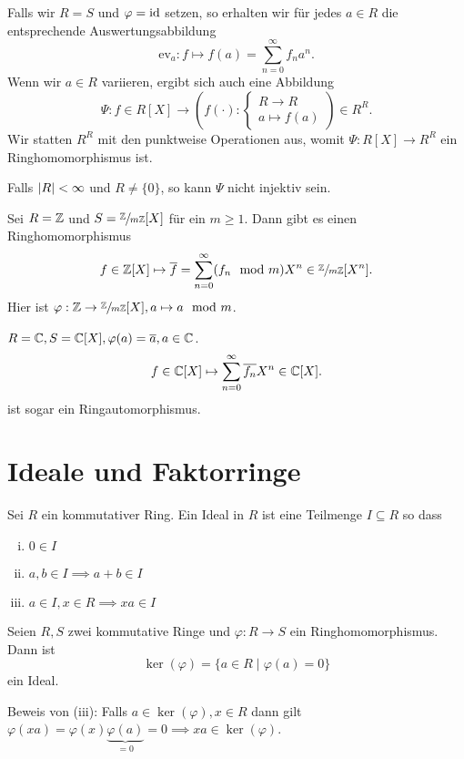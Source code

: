 \begin{eg}
	Falls wir $R = S$ und $\varphi = \operatorname{id}$ setzen, so erhalten wir für jedes $a \in R$ die entsprechende Auswertungsabbildung
	\[
		\text{ev}_{a} : f \mapsto f(a) = \sum_{n=0}^{\infty} f_{n} a^{n}
	.\] 
	Wenn wir $a \in R$ variieren, ergibt sich auch eine Abbildung
	\[
		\Psi: f \in R[X] \to \left(f(\cdot): \begin{cases}
			R \to R\\
			a \mapsto f(a)
		\end{cases}\right) \in R^{R}
	.\]
	Wir statten $R^{R}$ mit den punktweise Operationen aus, womit $\Psi: R[X] \to R^{R}$ ein Ringhomomorphismus ist.
	
	Falls $\abs{R} < \infty$ und $R \neq \{0\}$, so kann $\Psi$ nicht injektiv sein. 
\end{eg}

\begin{eg}
	Sei $R = \mathbb{Z}$ und $S = \sfrac{\mathbb{Z}}{m\mathbb{Z}}[X]$ für ein $m \geq 1$.
	Dann gibt es einen Ringhomomorphismus
	\[
		f \in \mathbb{Z}[X] \mapsto \overline{f} = \sum_{n=0}^{\infty} (f_{n} \mod m) X^{n} \in \sfrac{\mathbb{Z}}{m\mathbb{Z}}[X^{n}]
	.\]
	Hier ist $\varphi: \mathbb{Z} \to \sfrac{\mathbb{Z}}{m\mathbb{Z}} [X], a \mapsto a \mod m$.
\end{eg}

\begin{eg}
	$R = \mathbb{C}, S = \mathbb{C}[X], \varphi(a) = \overline{a}, a \in \mathbb{C}$.
	\[
		f \in \mathbb{C}[X] \mapsto \sum_{n=0}^{\infty} \overline{f_{n}} X^{n} \in \mathbb{C}[X]
	.\] 
	ist sogar ein Ringautomorphismus.
\end{eg}

\section{Ideale und Faktorringe}

\begin{definition}
	Sei $R$ ein kommutativer Ring.
	Ein Ideal in $R$ ist eine Teilmenge $I \subseteq R$ so dass
	\begin{enumerate}[(i)]
		\item $0 \in I$ 
		\item $a,b \in I \implies a + b \in I$
		\item $a \in I, x \in R \implies xa \in I$
	\end{enumerate}
\end{definition}

\begin{eg}
	Seien $R,S$ zwei kommutative Ringe und $\varphi: R \to S$ ein Ringhomomorphismus. Dann ist
	\[
		\ker(\varphi) = \{a \in R \mid \varphi(a) = 0\} 
	\] 
	ein Ideal.

	Beweis von (iii): Falls $a \in \ker(\varphi), x \in R$ dann gilt $\varphi(xa) = \varphi(x) \underbrace{\varphi(a)}_{=0} = 0 \implies  xa \in \ker(\varphi)$.
\end{eg}

